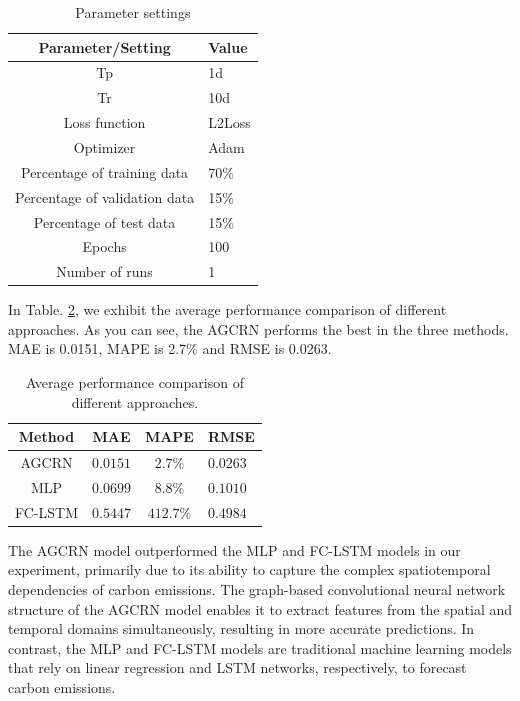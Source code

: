 \documentclass[sigconf, authordraft]{acmart}
\begin{document}
\begin{table}
	\caption{Parameter settings }
	\label{Parameter settings }
	\begin{tabular}{cl}
		\toprule Parameter/Setting    & Value  \\
		\midrule Tp                   & 1d     \\
		Tr                            & 10d    \\
		Loss function                 & L2Loss \\
		Optimizer                     & Adam   \\
		Percentage of training data   & 70\%   \\
		Percentage of validation data & 15\%   \\
		Percentage of test data       & 15\%   \\
		Epochs                        & 100    \\
		Number of runs                & 1      \\
		\bottomrule
	\end{tabular}
\end{table}

In Table. \ref{Average performance}, we exhibit the average performance comparison
of different approaches. As you can see, the AGCRN performs the best in the three
methods. MAE is 0.0151, MAPE is 2.7\% and RMSE is 0.0263.

\begin{table}
	\caption{Average performance comparison of different approaches.}
	\label{Average performance}
	\begin{tabular}{cccl}
		\toprule Method & MAE      & MAPE      & RMSE     \\
		\midrule AGCRN  & $0.0151$ & $2.7\%$   & $0.0263$ \\
		MLP             & $0.0699$ & $8.8\%$   & $0.1010$ \\
		FC-LSTM         & $0.5447$ & $412.7\%$ & $0.4984$ \\
		\bottomrule
	\end{tabular}
\end{table}

The AGCRN model outperformed the MLP and FC-LSTM models in our experiment,
primarily due to its ability to capture the complex spatiotemporal
dependencies of carbon emissions. The graph-based convolutional neural network
structure of the AGCRN model enables it to extract features from the spatial and
temporal domains simultaneously, resulting in more accurate predictions. In contrast,
the MLP and FC-LSTM models are traditional machine learning models that rely
on linear regression and LSTM networks, respectively, to forecast carbon
emissions.
\end{document}
